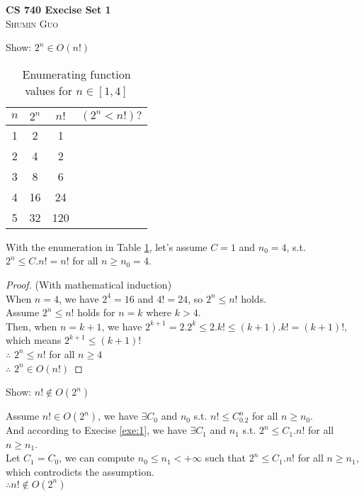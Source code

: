 \documentclass{article}
\newcommand{\tickYes}{\checkmark}
\newcommand{\tickNo}{\hspace{1pt}\ding{55}}
\begin{document}
\begin{center}
\textbf{\Huge{CS 740 Execise Set 1}}\\
\textsc{Shumin Guo}
\end{center}

\begin{enumerate}
\LARGE{\item Show: $2^n \in O(n!)$\label{exe:1}}
\large{
\begin{table}[ht]
  \begin{center}
    \begin{tabular}{cccc}
      \toprule $n$ & $2^n$ & $n!$ & $(2^n < n!) ?$ \\
      \midrule 1 & 2 & 1 & \tickNo \\
      \midrule 2 & 4 & 2 & \tickNo \\
      \midrule 3 & 8 & 6 & \tickNo \\
      \midrule 4 & 16 & 24 & \tickYes \\
      \midrule 5 & 32 & 120 & \tickYes \\
      \bottomrule
    \end{tabular}
    \caption{Enumerating function values for $n\in[1,4]$\label{enum}}
  \end{center}
\end{table}

With the enumeration in Table \ref{enum}, let's assume $C=1$ and
$n_0=4$, s.t. \\ $2^n \le C.n! = n!$ for all $n\ge n_0 = 4$. 

\begin{proof}
(With mathematical induction) \\
 When $n = 4$, we have $2^4 = 16$ and $4! = 24$, so $2^n\le 
n!$ holds. \\  
 Assume $2^n \le n!$ holds for $n = k$ where $k > 4$. \\
Then, when $n = k + 1$, we have $2^{k+1}=2.2^k\le 2.k!\le (k+1).k! = (k+1)!$, \\
which means $2^{k+1} \le (k+1)!$ \\
$\therefore$ $2^n \le n!$ for all $n\ge 4$\\
$\therefore$ $2^n\in O(n!)$ 
\end{proof}
}
\LARGE{\item Show: $n! \notin O(2^n)$}

\large{
  Assume $n! \in O(2^n)$, we have $\exists C_0$ and $n_0$ s.t. $n!\le C_0.2^n$
  for all $n\ge n_0$. \\ 
  And according to Execise \ref{exe:1}, we have $\exists C_1$ and $n_1$
  s.t. $2^n\le C_1.n!$ for all $n\ge n_1$.  \\
  Let $C_1 = C_0$, we can compute $n_0\le n_1$$<+\infty$ such that
  $2^n\le C_1.n!$ for all $n\ge n_1$, which controdicts the
  assumption. \\  
  $\therefore n! \notin O(2^n)$
}


\end{enumerate}
\end{document}
